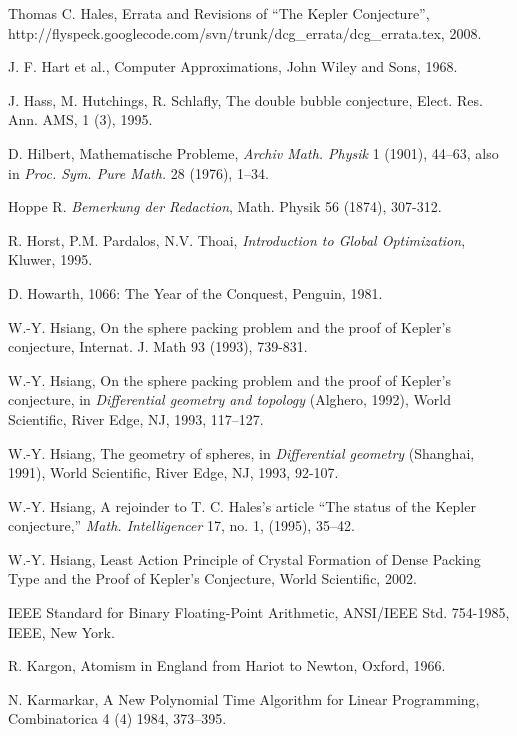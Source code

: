 \begin{thebibliography}{CHMS94}
 Thomas C. Hales, Errata and Revisions of ``The Kepler Conjecture'',
   http://flyspeck.googlecode.com/svn/trunk/dcg\_errata/dcg\_errata.tex, 2008.

 J. F. Hart et al., Computer Approximations,
John Wiley and Sons, 1968.

 J. Hass, M. Hutchings, R. Schlafly, The double bubble conjecture,
   Elect. Res. Ann.  AMS, 1 (3), 1995.

 D. Hilbert, Mathematische Probleme, {\it Archiv Math. Physik} 1 (1901),
    44--63, also in {\it Proc. Sym. Pure Math.} 28 (1976), 1--34.

 Hoppe R. {\it Bemerkung der Redaction}, Math. Physik 56
(1874), 307-312.

 R. Horst, P.M. Pardalos, N.V. Thoai, {\it Introduction
    to Global Optimization}, Kluwer, 1995.

 D. Howarth, 1066: The Year of the Conquest, Penguin, 1981.

 W.-Y. Hsiang, On the sphere packing problem and the proof
    of Kepler's conjecture, Internat. J. Math 93 (1993), 739-831.

 W.-Y. Hsiang, On the sphere packing problem and the
    proof of Kepler's conjecture, in {\it Differential geometry and
    topology} (Alghero, 1992), World Scientific, River Edge,
    NJ, 1993,  117--127.

 W.-Y. Hsiang, The geometry of spheres, in {\it Differential
    geometry} (Shanghai, 1991), World Scientific, River Edge, NJ,
    1993, 92-107.

 W.-Y. Hsiang, A rejoinder to T. C. Hales's article ``The status
    of the Kepler conjecture,'' {\it Math. Intelligencer} 17, no. 1, (1995),
    35--42.

 W.-Y. Hsiang, Least Action Principle of Crystal Formation
of Dense Packing Type and the Proof of Kepler's Conjecture, World
Scientific, 2002.

 IEEE Standard for Binary Floating-Point
Arithmetic, ANSI/IEEE Std. 754-1985, IEEE, New York.


 R. Kargon, Atomism in England from Hariot to Newton,
    Oxford, 1966.

 N. Karmarkar, A New Polynomial Time Algorithm
for Linear Programming, Combinatorica 4 (4) 1984, 373--395.


\end{thebibliography}

